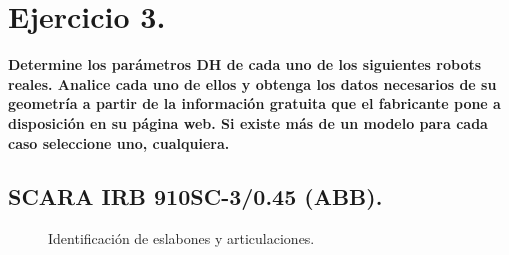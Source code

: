\documentclass[a4paper,12pt]{article}
\begin{document}
\section{Ejercicio 3.}
\textbf{Determine los parámetros DH de cada uno de los siguientes robots reales. Analice
cada uno de ellos y obtenga los datos necesarios de su geometría a partir de la información
gratuita que el fabricante pone a disposición en su página web. Si existe más de un modelo
para cada caso seleccione uno, cualquiera.}

\subsection{SCARA IRB 910SC-3/0.45 (ABB).}

\begin{figure}[H]
    \centering
    \begin{adjustbox}{scale = 0.662, max width=\columnwidth}
    \end{adjustbox}
    \caption{Identificación de eslabones y articulaciones.}
    \label{scara_eslabones_articulaciones}
\end{figure}
\end{document}
